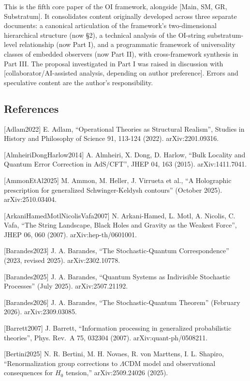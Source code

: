 \documentclass[
]{article}
\begin{document}
This is the fifth core paper of the OI framework, alongside {[}Main, SM,
GR, Substratum{]}. It consolidates content originally developed across
three separate documents: a canonical articulation of the framework's
two-dimensional hierarchical structure (now §2), a technical analysis of
the OI-string substratum-level relationship (now Part I), and a
programmatic framework of universality classes of embedded observers
(now Part II), with cross-framework synthesis in Part III. The proposal
investigated in Part I was raised in discussion with
{[}collaborator/AI-assisted analysis, depending on author preference{]}.
Errors and speculative content are the author's responsibility.

\hypertarget{references}{%
\subsection{References}\label{references}}

{[}Adlam2022{]} E. Adlam, ``Operational Theories as Structural
Realism'', Studies in History and Philosophy of Science 91, 113-124
(2022). arXiv:2201.09316.

{[}AlmheiriDongHarlow2014{]} A. Almheiri, X. Dong, D. Harlow, ``Bulk
Locality and Quantum Error Correction in AdS/CFT'', JHEP 04, 163 (2015).
arXiv:1411.7041.

{[}AmmonEtAl2025{]} M. Ammon, M. Heller, J. Virrueta et al., ``A
Holographic prescription for generalized Schwinger-Keldysh contours''
(October 2025). arXiv:2510.03404.

{[}ArkaniHamedMotlNicolisVafa2007{]} N. Arkani-Hamed, L. Motl, A.
Nicolis, C. Vafa, ``The String Landscape, Black Holes and Gravity as the
Weakest Force'', JHEP 06, 060 (2007). arXiv:hep-th/0601001.

{[}Barandes2023{]} J. A. Barandes, ``The Stochastic-Quantum
Correspondence'' (2023, revised 2025). arXiv:2302.10778.

{[}Barandes2025{]} J. A. Barandes, ``Quantum Systems as Indivisible
Stochastic Processes'' (July 2025). arXiv:2507.21192.

{[}Barandes2026{]} J. A. Barandes, ``The Stochastic-Quantum Theorem''
(February 2026). arXiv:2309.03085.

{[}Barrett2007{]} J. Barrett, ``Information processing in generalized
probabilistic theories'', Phys. Rev.~A 75, 032304 (2007).
arXiv:quant-ph/0508211.

{[}Bertini2025{]} N. R. Bertini, M. H. Novaes, R. von Marttens, I. L.
Shapiro, ``Renormalization group corrections to \(\Lambda\)CDM model and
observational consequences for \(H_0\) tension,'' arXiv:2509.24026
(2025).
\end{document}
